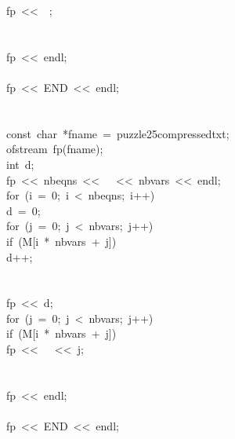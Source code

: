 \begin{tabbing}
\>\>\>\>fp\ <<\ \ ;\\[0pt]
\>\>\>\>\\[0pt]
\>\>\>\\[0pt]
\>\>fp\ <<\ endl;\\[0pt]
\>\>\\[0pt]
\>fp\ <<\ END\ <<\ endl;\>\\[0pt]
\>\\[0pt]
\>\\[0pt]
\>const\ char\ *fname\ =\ puzzle25compressedtxt;\\[0pt]
\>ofstream\ fp(fname);\\[0pt]
\>int\ d;\\[0pt]
\>fp\ <<\ nbeqns\ <<\ \ \ <<\ nbvars\ <<\ endl;\\[0pt]
\>for\ (i\ =\ 0;\ i\ <\ nbeqns;\ i++)\ \\[0pt]
\>\>d\ =\ 0;\\[0pt]
\>\>for\ (j\ =\ 0;\ j\ <\ nbvars;\ j++)\ \\[0pt]
\>\>\>if\ (M[i\ *\ nbvars\ +\ j])\ \\[0pt]
\>\>\>\>d++;\\[0pt]
\>\>\>\>\\[0pt]
\>\>\>\\[0pt]
\>\>fp\ <<\ d;\\[0pt]
\>\>for\ (j\ =\ 0;\ j\ <\ nbvars;\ j++)\ \\[0pt]
\>\>\>if\ (M[i\ *\ nbvars\ +\ j])\ \\[0pt]
\>\>\>\>fp\ <<\ \ \ <<\ j;\\[0pt]
\>\>\>\>\\[0pt]
\>\>\>\\[0pt]
\>\>fp\ <<\ endl;\\[0pt]
\>\>\\[0pt]
\>fp\ <<\ END\ <<\ endl;\>\\[0pt]
\>\\[0pt]
\\[0pt]
\\[0pt]
\\[0pt]
\\[0pt]
\end{tabbing}
